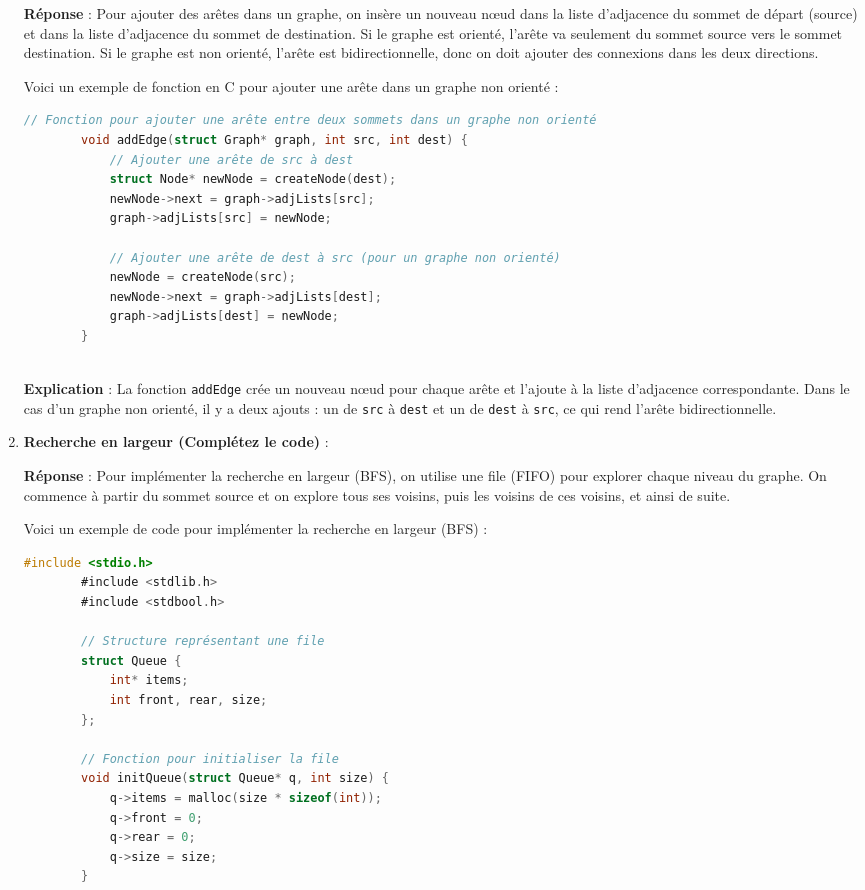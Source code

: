 \begin{enumerate}
	\textbf{Réponse} :
	Pour ajouter des arêtes dans un graphe, on insère un nouveau nœud dans la liste d'adjacence du sommet de départ (source) et dans la liste d'adjacence du sommet de destination. Si le graphe est orienté, l'arête va seulement du sommet source vers le sommet destination. Si le graphe est non orienté, l'arête est bidirectionnelle, donc on doit ajouter des connexions dans les deux directions.
	
	Voici un exemple de fonction en C pour ajouter une arête dans un graphe non orienté :
	
	\begin{lstlisting}[language=C]
		// Fonction pour ajouter une arête entre deux sommets dans un graphe non orienté
		void addEdge(struct Graph* graph, int src, int dest) {
			// Ajouter une arête de src à dest
			struct Node* newNode = createNode(dest);
			newNode->next = graph->adjLists[src];
			graph->adjLists[src] = newNode;
			
			// Ajouter une arête de dest à src (pour un graphe non orienté)
			newNode = createNode(src);
			newNode->next = graph->adjLists[dest];
			graph->adjLists[dest] = newNode;
		}
		
	\end{lstlisting}
	
	\textbf{Explication} :
	La fonction \texttt{addEdge} crée un nouveau nœud pour chaque arête et l'ajoute à la liste d'adjacence correspondante. Dans le cas d'un graphe non orienté, il y a deux ajouts : un de \texttt{src} à \texttt{dest} et un de \texttt{dest} à \texttt{src}, ce qui rend l'arête bidirectionnelle.
	
	\item \textbf{Recherche en largeur (Complétez le code)} :
	
	\textbf{Réponse} :
	Pour implémenter la recherche en largeur (BFS), on utilise une file (FIFO) pour explorer chaque niveau du graphe. On commence à partir du sommet source et on explore tous ses voisins, puis les voisins de ces voisins, et ainsi de suite.
	
	Voici un exemple de code pour implémenter la recherche en largeur (BFS) :
	
	\begin{lstlisting}[language=C]
		#include <stdio.h>
		#include <stdlib.h>
		#include <stdbool.h>
		
		// Structure représentant une file
		struct Queue {
			int* items;
			int front, rear, size;
		};
		
		// Fonction pour initialiser la file
		void initQueue(struct Queue* q, int size) {
			q->items = malloc(size * sizeof(int));
			q->front = 0;
			q->rear = 0;
			q->size = size;
		}
		

\end{lstlisting}
\end{enumerate}
